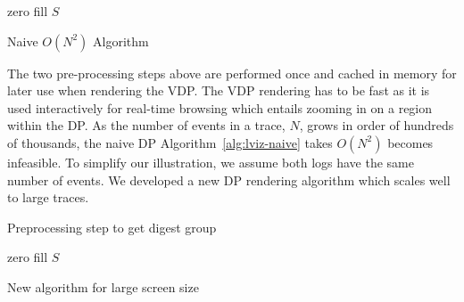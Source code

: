 \begin{algorithm}[htb]
\BlankLine
zero fill $S$\;
\caption{Naive $O(N^2)$ Algorithm}
\label{alg:lviz-naive}
\end{algorithm}

The two pre-processing steps above are performed once and
cached in memory for later use when rendering the VDP.
The VDP rendering has to be fast as it is
used interactively for real-time browsing 
which entails zooming in on a region within the DP.
As the number of events in a trace, $N$, grows in order of hundreds of thousands,
the naive DP Algorithm~\ref{alg:lviz-naive}
takes $O(N^2)$ becomes infeasible.
To simplify our illustration, we assume both logs have the same number
of events.
We developed a new DP rendering algorithm which scales well to large traces.

\begin{algorithm}[htb]
\BlankLine
{}
\caption{Preprocessing step to get digest group}
\label{alg:lviz-algpre}
\end{algorithm}

\begin{algorithm}[htb]
\BlankLine
zero fill $S$\;
\caption{New algorithm for large screen size}
\label{alg:lviz-alg1}
\end{algorithm}

